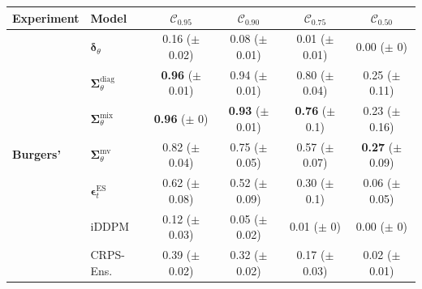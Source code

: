  \begin{tabular}{|l|l|cccc|}
    \toprule
        Experiment & Model & $\mathcal{C}_{0.95}$ & $\mathcal{C}_{0.90}$ & $\mathcal{C}_{0.75}$ & $\mathcal{C}_{0.50}$ \\
        \midrule
        \multirow{8}{*}{\textbf{Burgers'}}
        & $\bm\delta_\theta$ & \makecell{0.16 \\ ($\pm$ 0.02)} & \makecell{0.08 \\ ($\pm$ 0.01)} & \makecell{0.01 \\ ($\pm$ 0.01)} & \makecell{0.00 \\ ($\pm$ 0)} \\
        & $\bm\Sigma_\theta^{\mathrm{diag}}$ & \makecell{\textbf{0.96} \\ ($\pm$ 0.01)} & \makecell{0.94 \\ ($\pm$ 0.01)} & \makecell{0.80 \\ ($\pm$ 0.04)} & \makecell{0.25 \\ ($\pm$ 0.11)} \\
        & $\bm\Sigma_\theta^{\mathrm{mix}}$ & \makecell{\textbf{0.96} \\ ($\pm$ 0)} & \makecell{\textbf{0.93} \\ ($\pm$ 0.01)} & \makecell{\textbf{0.76} \\ ($\pm$ 0.1)} & \makecell{0.23 \\ ($\pm$ 0.16)} \\
        & $\bm\Sigma_\theta^{\mathrm{mv}}$ & \makecell{0.82 \\ ($\pm$ 0.04)} & \makecell{0.75 \\ ($\pm$ 0.05)} & \makecell{0.57 \\ ($\pm$ 0.07)} & \makecell{\textbf{0.27} \\ ($\pm$ 0.09)} \\
        & $\bm\epsilon_t^\mathrm{ES}$ & \makecell{0.62 \\ ($\pm$ 0.08)} & \makecell{0.52 \\ ($\pm$ 0.09)} & \makecell{0.30 \\ ($\pm$ 0.1)} & \makecell{0.06 \\ ($\pm$ 0.05)} \\
        & iDDPM & \makecell{0.12 \\ ($\pm$ 0.03)} & \makecell{0.05 \\ ($\pm$ 0.02)} & \makecell{0.01 \\ ($\pm$ 0)} & \makecell{0.00 \\ ($\pm$ 0)} \\
        & CRPS-Ens. & \makecell{0.39 \\ ($\pm$ 0.02)} & \makecell{0.32 \\ ($\pm$ 0.02)} & \makecell{0.17 \\ ($\pm$ 0.03)} & \makecell{0.02 \\ ($\pm$ 0.01)} \\

\end{tabular}
